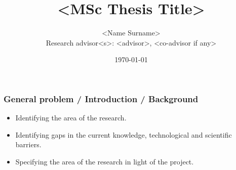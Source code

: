 \documentclass[aspectratio=169]{beamer}
\begin{document}


\title{<MSc Thesis Title>} 

\author[<Name Surname>]{<Name Surname>\\[1ex]{\small Research advisor<s>: <advisor>, <co-advisor if any>}}


\date{\today}
\frame{\titlepage}




\begin{frame}
    \frametitle{General problem / Introduction / Background}
 
    \begin{itemize}
        \item Identifying the area of the research.
        \newline
        \item Identifying gaps in the current knowledge, technological and scientific barriers.
        \newline
        \item Specifying the area of the research in light of the project.
    \end{itemize}

\end{frame}

\end{document}
